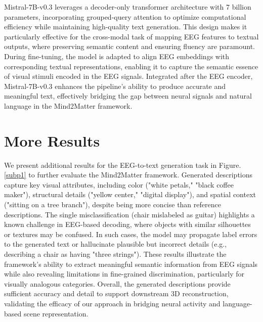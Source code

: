 \documentclass[sigconf]{acmart}
\begin{document}
Mistral-7B-v0.3 leverages a decoder-only transformer architecture with 7 billion parameters, incorporating grouped-query attention to optimize computational efficiency while maintaining high-quality text generation. This design makes it particularly effective for the cross-modal task of mapping EEG features to textual outputs, where preserving semantic content and ensuring fluency are paramount. During fine-tuning, the model is adapted to align EEG embeddings with corresponding textual representations, enabling it to capture the semantic essence of visual stimuli encoded in the EEG signals. Integrated after the EEG encoder, Mistral-7B-v0.3 enhances the pipeline’s ability to produce accurate and meaningful text, effectively bridging the gap between neural signals and natural language in the Mind2Matter framework.

\section{More Results}
We present additional results for the EEG-to-text generation task in Figure.\ref{subp1} to further evaluate the Mind2Matter framework. Generated descriptions capture key visual attributes, including color ("white petals," "black coffee maker"), structural details ("yellow center," "digital display"), and spatial context ("sitting on a tree branch"), despite being more concise than reference descriptions. The single misclassification (chair mislabeled as guitar) highlights a known challenge in EEG-based decoding, where objects with similar silhouettes or textures may be confused. In such cases, the model may propagate label errors to the generated text or hallucinate plausible but incorrect details (e.g., describing a chair as having "three strings"). These results illustrate the framework's ability to extract meaningful semantic information from EEG signals while also revealing limitations in fine-grained discrimination, particularly for visually analogous categories. Overall, the generated descriptions provide sufficient accuracy and detail to support downstream 3D reconstruction, validating the efficacy of our approach in bridging neural activity and language-based scene representation.
\end{document}
